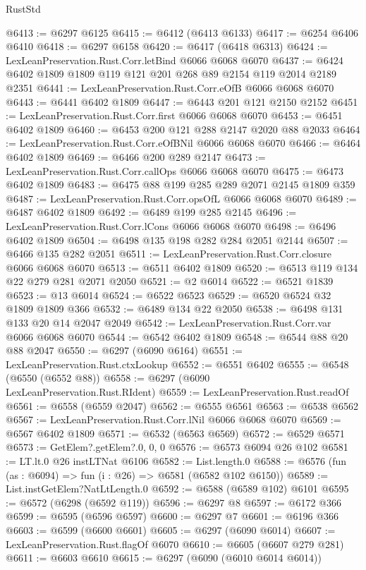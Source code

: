 \begin{lexlean}{RustStd}
\begin{coremodule}
@6413 := @6297 @6125
@6415 := @6412 (@6413 @6133)
@6417 := @6254 @6406 @6410
@6418 := @6297 @6158
@6420 := @6417 (@6418 @6313)
@6424 := LexLeanPreservation.Rust.Corr.letBind @6066 @6068 @6070
@6437 := @6424 @6402 @1809 @1809 @119 @121 @201 @268 @89 @2154 @119 @2014 @2189 @2351
@6441 := LexLeanPreservation.Rust.Corr.eOfB @6066 @6068 @6070
@6443 := @6441 @6402 @1809
@6447 := @6443 @201 @121 @2150 @2152
@6451 := LexLeanPreservation.Rust.Corr.first @6066 @6068 @6070
@6453 := @6451 @6402 @1809
@6460 := @6453 @200 @121 @288 @2147 @2020 @88 @2033
@6464 := LexLeanPreservation.Rust.Corr.eOfBNil @6066 @6068 @6070
@6466 := @6464 @6402 @1809
@6469 := @6466 @200 @289 @2147
@6473 := LexLeanPreservation.Rust.Corr.callOps @6066 @6068 @6070
@6475 := @6473 @6402 @1809
@6483 := @6475 @88 @199 @285 @289 @2071 @2145 @1809 @359
@6487 := LexLeanPreservation.Rust.Corr.opsOfL @6066 @6068 @6070
@6489 := @6487 @6402 @1809
@6492 := @6489 @199 @285 @2145
@6496 := LexLeanPreservation.Rust.Corr.lCons @6066 @6068 @6070
@6498 := @6496 @6402 @1809
@6504 := @6498 @135 @198 @282 @284 @2051 @2144
@6507 := @6466 @135 @282 @2051
@6511 := LexLeanPreservation.Rust.Corr.closure @6066 @6068 @6070
@6513 := @6511 @6402 @1809
@6520 := @6513 @119 @134 @22 @279 @281 @2071 @2050
@6521 := @2 @6014
@6522 := @6521 @1839
@6523 := @13 @6014
@6524 := @6522 @6523
@6529 := @6520 @6524 @32 @1809 @1809 @366
@6532 := @6489 @134 @22 @2050
@6538 := @6498 @131 @133 @20 @14 @2047 @2049
@6542 := LexLeanPreservation.Rust.Corr.var @6066 @6068 @6070
@6544 := @6542 @6402 @1809
@6548 := @6544 @88 @20 @88 @2047
@6550 := @6297 (@6090 @6164)
@6551 := LexLeanPreservation.Rust.ctxLookup
@6552 := @6551 @6402
@6555 := @6548 (@6550 (@6552 @88))
@6558 := @6297 (@6090 LexLeanPreservation.Rust.RIdent)
@6559 := LexLeanPreservation.Rust.readOf
@6561 := @6558 (@6559 @2047)
@6562 := @6555 @6561
@6563 := @6538 @6562
@6567 := LexLeanPreservation.Rust.Corr.lNil @6066 @6068 @6070
@6569 := @6567 @6402 @1809
@6571 := @6532 (@6563 @6569)
@6572 := @6529 @6571
@6573 := GetElem?.getElem?.{0, 0, 0}
@6576 := @6573 @6094 @26 @102
@6581 := LT.lt.{0} @26 instLTNat @6106
@6582 := List.length.{0}
@6588 := @6576 (fun (as : @6094) => fun (i : @26) => @6581 (@6582 @102 @6150))
@6589 := List.instGetElem?NatLtLength.{0}
@6592 := @6588 (@6589 @102) @6101
@6595 := @6572 (@6298 (@6592 @119))
@6596 := @6297 @8
@6597 := @6172 @366
@6599 := @6595 (@6596 @6597)
@6600 := @6297 @7
@6601 := @6196 @366
@6603 := @6599 (@6600 @6601)
@6605 := @6297 (@6090 @6014)
@6607 := LexLeanPreservation.Rust.flagOf @6070
@6610 := @6605 (@6607 @279 @281)
@6611 := @6603 @6610
@6615 := @6297 (@6090 (@6010 @6014 @6014))

\end{coremodule}
\end{lexlean}

